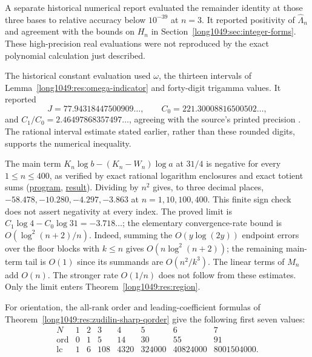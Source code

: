 \documentclass[11pt]{article}
\begin{document}
A separate historical numerical report evaluated the remainder identity
at those three bases to relative accuracy below $10^{-39}$ at $n=3$.
It reported positivity of $\widehat\Lambda_n$ and agreement with the
bounds on $H_n$ in Section~\ref{long1049:sec:integer-forms}. These
high-precision real evaluations were not reproduced by the exact
polynomial calculation just described.

The historical constant evaluation used $\omega$, the thirteen intervals
of Lemma~\ref{long1049:res:omega-indicator} and forty-digit trigamma values.
It reported
\[
 J=77.94318447500909\ldots,\qquad C_0=221.30008816500502\ldots,
\]
and $C_1/C_0=2.46497868357497\ldots$, agreeing with the source's printed
precision \cite[p.~162]{zudilin2004}. The rational interval estimate stated earlier, rather than these
rounded digits, supports the numerical inequality.

The main term $K_n\log b-(K_n-W_n)\log a$ at $31/4$ is negative
for every $1\le n\le400$, as verified by exact rational logarithm
enclosures and exact totient sums (\href{https://github.com/wcook04/plectis-erdos/blob/4beca4ad0c00a626def9c73f2420e20ebf8d1968/research/experiments/erdos1049/main_term_31_4.py}{program}, \href{https://github.com/wcook04/plectis-erdos/blob/4beca4ad0c00a626def9c73f2420e20ebf8d1968/research/experiments/erdos1049/receipts/main-term-31-4.json}{result}). Dividing by $n^2$ gives, to three
decimal places, $-58.478,-10.280,-4.297,-3.863$ at
$n=1,10,100,400$. This finite sign check does not assert negativity at
every index. The proved limit is
$C_1\log4-C_0\log31=-3.718\ldots$; the elementary convergence-rate bound
is $O(\log^2(n+2)/n)$.
Indeed, summing the $O(y\log(2y))$ endpoint errors over the floor blocks
with $k\le n$ gives $O(n\log^2(n+2))$; the remaining main-term tail is
$O(1)$ since its summands are $O(n^2/k^3)$.  The linear terms of $M_n$
add $O(n)$.  The stronger rate $O(1/n)$ does not follow from these estimates.  Only the limit enters Theorem~\ref{long1049:res:region}.

For orientation, the all-rank order and leading-coefficient formulas of
Theorem~\ref{long1049:res:zudilin-sharp-qorder} give the following first seven values:
\[
\begin{array}{c|rrrrrrr}
N&1&2&3&4&5&6&7\\\hline
\operatorname{ord}&0&1&5&14&30&55&91\\
\operatorname{lc}&1&6&108&4320&324000&40824000&8001504000.
\end{array}
\]
\end{document}
